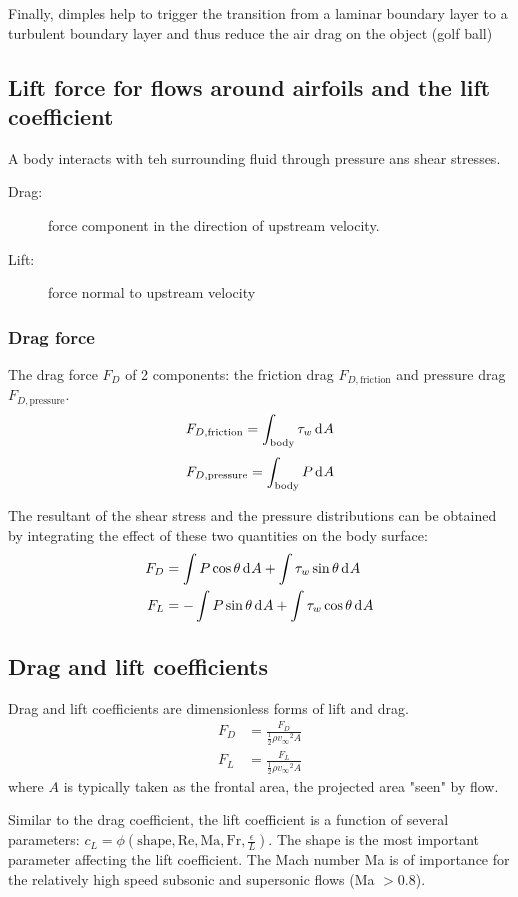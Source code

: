 \documentclass[10pt, twocolumn]{article}
\begin{document}
Finally, dimples help to trigger the transition from a laminar boundary layer to a turbulent boundary layer and thus reduce the air drag on the object (golf ball)


\subsection{Lift force for flows around airfoils and the lift coefficient}
A body interacts with teh surrounding fluid through pressure ans shear stresses.
\begin{description}
  \item[Drag:] force component in the direction of upstream velocity.
  \item[Lift:] force normal to upstream velocity
\end{description}


\subsubsection{Drag force}
The drag force \(F_D\) of 2 components: the friction drag \(F_{D,\mathrm{friction}}\) and pressure drag \(F_{D,\mathrm{pressure}}\).
\[
  F_{D,\mathrm{friction}} = \int_\mathrm{body}{\tau_w \,\mathrm{d}^{} A}
\]
\[
  F_{D,\mathrm{pressure}} = \int_\mathrm{body}{P \,\mathrm{d}^{} A}
\]

The resultant of the shear stress and the pressure distributions can be obtained by integrating the effect of these two quantities on the body surface:
\begin{align*}
  F_D & = \int{P \cos\theta \,\mathrm{d}^{} A} + \int{\tau_w \sin\theta \,\mathrm{d}^{} A}   \\
  F_L & = - \int{P \sin\theta \,\mathrm{d}^{} A} + \int{\tau_w \cos\theta \,\mathrm{d}^{} A}
\end{align*}


\subsection{Drag and lift coefficients}
Drag and lift coefficients are dimensionless forms of lift and drag.
\begin{align*}
  F_D & = \frac{F_D}{\frac{1}{2}\rho {v_\infty}^2 A} \\
  F_L & = \frac{F_L}{\frac{1}{2}\rho {v_\infty}^2 A}
\end{align*}
where \(A\) is typically taken as the frontal area, the projected area "seen" by flow.

Similar to the drag coefficient, the lift coefficient is a function of several parameters: \(c_L = \phi\left( \mathrm{shape}, \mathrm{Re}, \mathrm{Ma}, \mathrm{Fr}, \frac{\epsilon}{L} \right)\).
The shape is the most important parameter affecting the lift coefficient.
The Mach number Ma is of importance for the relatively high speed subsonic and supersonic flows (Ma \(> 0.8\)).
\end{document}
